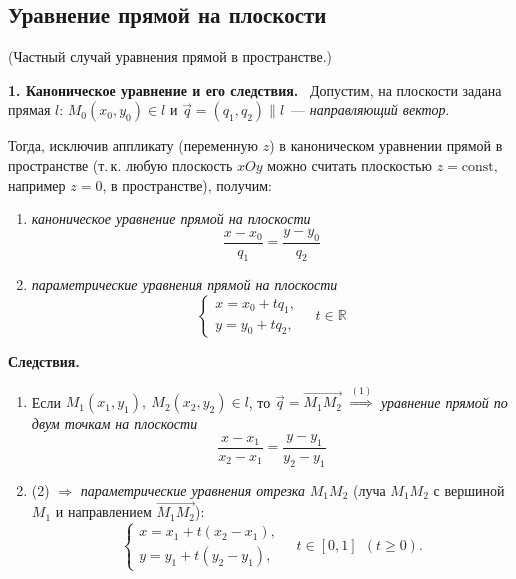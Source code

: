 \documentclass[a4paper,11pt]{article}
\newcommand{\lead}[1]{\textbf{\color{leadcol}#1}\ }
\begin{document}
\subsection{Уравнение прямой на плоскости}
(Частный случай уравнения прямой в пространстве.)


\lead{1. Каноническое уравнение и его следствия.}
Допустим, на плоскости задана прямая $l$: $M_0(x_0,y_0)\in l$ и $\vec q=(q_1,q_2)\parallel l$~---
\emph{направляющий вектор}.
\begin{center}
\end{center}
Тогда, исключив аппликату (переменную $z$) в каноническом уравнении прямой в пространстве
(т.\,к. любую плоскость $xOy$ можно считать плоскостью $z=\mathrm{const}$, например $z=0$,
в пространстве), получим:
\begin{enumerate}[label=\arabic*)]
\item \emph{каноническое уравнение прямой на плоскости}
\[
\boxed{\ \frac{x-x_0}{q_1}=\frac{y-y_0}{q_2}\ }\tag{1}
\]
\item \emph{параметрические уравнения прямой на плоскости}
\[
\boxed{\ \begin{cases}x=x_0+tq_1,\\y=y_0+tq_2,\end{cases}\quad t\in\mathbb R\ }\tag{2}
\]
\end{enumerate}

\textbf{Следствия.}
\begin{enumerate}[label=\arabic*.]
\item Если $M_1(x_1,y_1),\ M_2(x_2,y_2)\in l$, то $\vec q=\overrightarrow{M_1M_2}$ $\stackrel{(1)}{\Rightarrow}$
\emph{уравнение прямой по двум точкам на плоскости}
\[
\boxed{\ \frac{x-x_1}{x_2-x_1}=\frac{y-y_1}{y_2-y_1}\ }\tag{3}
\]
\item (2) $\Rightarrow$ \emph{параметрические уравнения отрезка} $M_1M_2$
(луча $M_1M_2$ с вершиной $M_1$ и направлением $\overrightarrow{M_1M_2}$):
\[
\begin{cases}x=x_1+t(x_2-x_1),\\y=y_1+t(y_2-y_1),\end{cases}\quad t\in[0,1]\ \ (t\ge0).\tag{4}
\]
\end{enumerate}
\end{document}
